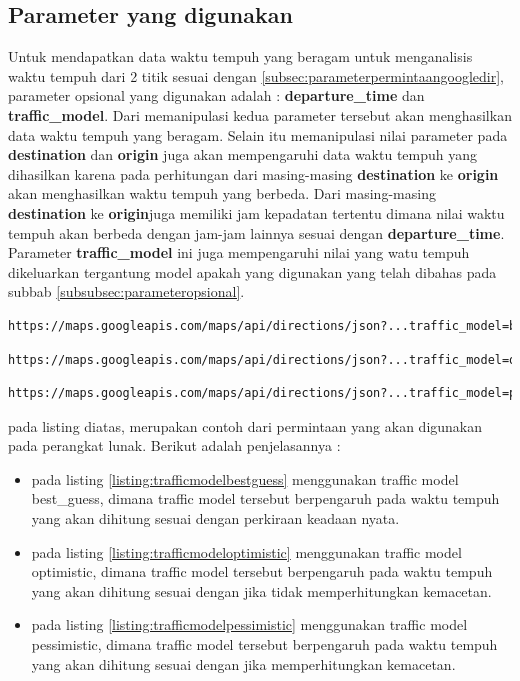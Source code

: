 \subsection{Parameter yang digunakan}
\label{subsec:parameterrequestaplikasi}			

Untuk mendapatkan data waktu tempuh yang beragam untuk menganalisis waktu tempuh dari 2 titik sesuai dengan \ref{subsec:parameterpermintaangoogledir}, parameter opsional yang digunakan adalah :  \textbf{departure\_time} dan \textbf{traffic\_model}. Dari memanipulasi kedua parameter tersebut akan menghasilkan data waktu tempuh yang beragam. Selain itu memanipulasi nilai parameter pada \textbf{destination} dan  \textbf{origin} juga akan mempengaruhi data waktu tempuh yang dihasilkan karena pada perhitungan dari masing-masing \textbf{destination} ke \textbf{origin} akan menghasilkan waktu tempuh yang berbeda. Dari masing-masing \textbf{destination} ke \textbf{origin}juga memiliki jam kepadatan tertentu dimana nilai waktu tempuh akan berbeda dengan jam-jam lainnya sesuai dengan \textbf{departure\_time}. Parameter \textbf{traffic\_model} ini juga mempengaruhi nilai yang watu tempuh dikeluarkan tergantung model apakah yang digunakan yang telah dibahas pada subbab \ref{subsubsec:parameteropsional}.

\begin{lstlisting}[caption= Traffic\_model : best\_guess, captionpos=b, label=listing:trafficmodelbestguess]
	https://maps.googleapis.com/maps/api/directions/json?...traffic_model=best_guess
\end{lstlisting}
\begin{lstlisting}[caption= Traffic\_model : optimistic, captionpos=b, label=listing:trafficmodeloptimistic]
	https://maps.googleapis.com/maps/api/directions/json?...traffic_model=optimistic
\end{lstlisting}
\begin{lstlisting}[caption= Traffic\_model : pessimistic, captionpos=b, label=listing:trafficmodelpessimistic]
	https://maps.googleapis.com/maps/api/directions/json?...traffic_model=pessimistic
\end{lstlisting}

pada listing diatas, merupakan contoh dari permintaan yang akan digunakan pada perangkat lunak. Berikut adalah penjelasannya :
\begin{itemize}
	\item pada listing \ref{listing:trafficmodelbestguess} menggunakan traffic model best\_guess, dimana traffic model tersebut berpengaruh pada waktu tempuh yang akan dihitung sesuai dengan perkiraan keadaan nyata.
	\item pada listing \ref{listing:trafficmodeloptimistic} menggunakan traffic model optimistic, dimana traffic model tersebut berpengaruh pada waktu tempuh yang akan dihitung sesuai dengan jika tidak memperhitungkan kemacetan.
	\item pada listing \ref{listing:trafficmodelpessimistic} menggunakan traffic model pessimistic, dimana traffic model tersebut berpengaruh pada waktu tempuh yang akan dihitung sesuai dengan jika memperhitungkan kemacetan.
\end{itemize}

